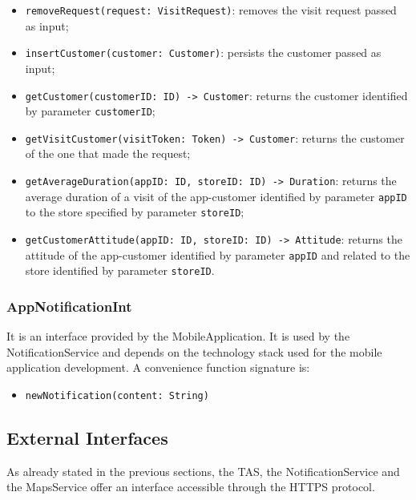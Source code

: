 \documentclass[a4paper,oneside,11pt]{book}
\newcommand{\red}[1]{\begingroup\color{punct}#1\endgroup}
\begin{document}
\begin{itemize}
       \item \texttt{removeRequest(request: \red{VisitRequest})}: \newline
       removes the visit request passed as input;
       \item \texttt{insertCustomer(customer: \red{Customer})}: \newline
       persists the customer passed as input;
       \item \texttt{getCustomer(customerID: \red{ID}) -> \red{Customer}}: \newline
       returns the customer identified by parameter \texttt{customerID};
       \item \texttt{getVisitCustomer(visitToken: \red{Token}) -> \red{Customer}}: \newline
       returns the customer of the one that made the request;
       \item \texttt{getAverageDuration(appID: \red{ID}, storeID: \red{ID}) -> \red{Duration}}: \newline
       returns the average duration of a visit of the app-customer identified by parameter \texttt{appID} to the store specified by parameter \texttt{storeID};
       \item \texttt{getCustomerAttitude(appID: \red{ID}, storeID: \red{ID}) -> \red{Attitude}}: \newline
       returns the attitude of the app-customer identified by parameter \texttt{appID} and related to the store identified by parameter \texttt{storeID}.
   \end{itemize}
   
    \subsubsection{AppNotificationInt}
    It is an interface provided by the MobileApplication. It is used by the NotificationService and depends on the technology stack used for the mobile application development. A convenience function signature is:
    \begin{itemize}
        \item \texttt{newNotification(content: \red{String})}
    \end{itemize}
    
    \subsection{External Interfaces}
    As already stated in the previous sections, the TAS, the NotificationService and the MapsService offer an interface accessible through the HTTPS protocol. 
\end{document}
